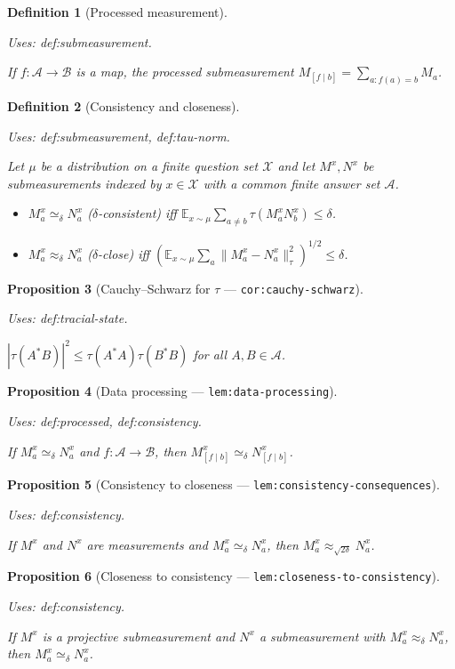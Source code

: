 \documentclass{article}
\providecommand{\uses}[1]{\par\smallskip\noindent\emph{Uses:} #1.\par\smallskip}
\newtheorem{definition}{Definition}[section]
\newtheorem{proposition}[definition]{Proposition}
\theoremstyle{remark}
\newcommand{\E}{\mathbb{E}}
\newcommand{\algebra}{\mathcal{A}}
\begin{document}
\begin{definition}[Processed measurement]\label{def:processed}
	\uses{def:submeasurement}
	If $f\colon\mathcal{A}\to\mathcal{B}$ is a map, the processed submeasurement
	$M_{[f\mid b]}=\sum_{a:f(a)=b}M_a$.
\end{definition}

\begin{definition}[Consistency and closeness]\label{def:consistency}
	\uses{def:submeasurement, def:tau-norm}
	Let $\mu$ be a distribution on a finite question set $\mathcal{X}$
	and let $M^x,N^x$ be submeasurements indexed by $x\in\mathcal{X}$
	with a common finite answer set $\mathcal{A}$.
	\begin{itemize}
		\item $M^x_a\simeq_\delta N^x_a$ ($\delta$-consistent) iff
		      $\E_{x\sim\mu}\sum_{a\ne b}\tau(M^x_a N^x_b)\le\delta$.
		\item $M^x_a\approx_\delta N^x_a$ ($\delta$-close) iff
		      $(\E_{x\sim\mu}\sum_a\|M^x_a-N^x_a\|_\tau^2)^{1/2}\le\delta$.
	\end{itemize}
\end{definition}

\begin{proposition}[Cauchy--Schwarz for $\tau$ --- \texttt{cor:cauchy-schwarz}]
	\label{cor:cauchy-schwarz}
	\uses{def:tracial-state}
	$|\tau(A^*B)|^2\le\tau(A^*A) \tau(B^*B)$ for all $A,B\in\algebra$.
\end{proposition}

\begin{proposition}[Data processing --- \texttt{lem:data-processing}]
	\label{lem:data-processing}
	\uses{def:processed, def:consistency}
	If $M^x_a\simeq_\delta N^x_a$ and $f\colon\mathcal{A}\to\mathcal{B}$,
	then $M^x_{[f\mid b]}\simeq_\delta N^x_{[f\mid b]}$.
\end{proposition}

\begin{proposition}[Consistency to closeness --- \texttt{lem:consistency-consequences}]
	\label{lem:consistency-consequences}
	\uses{def:consistency}
	If $M^x$ and $N^x$ are measurements and $M^x_a\simeq_\delta N^x_a$,
	then $M^x_a\approx_{\sqrt{2\delta}} N^x_a$.
\end{proposition}

\begin{proposition}[Closeness to consistency --- \texttt{lem:closeness-to-consistency}]
	\label{lem:closeness-to-consistency}
	\uses{def:consistency}
	If $M^x$ is a projective submeasurement and $N^x$ a submeasurement with
	$M^x_a\approx_\delta N^x_a$, then $M^x_a\simeq_\delta N^x_a$.
\end{proposition}
\end{document}
